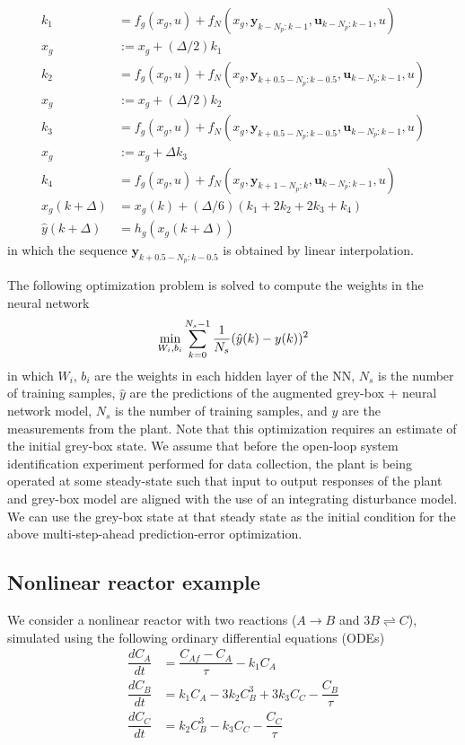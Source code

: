 \documentclass{article}
\begin{document}
\begin{align*}
  k_1 &= f_g(x_g, u) + 
  f_N(x_g, \mathbf{y}_{k-N_p:k-1}, \mathbf{u}_{k-N_p:k-1}, u) \\
  x_g & := x_g + (\Delta/2)k_1 \\
  k_2 &= f_g(x_g, u) + 
  f_N(x_g, \mathbf{y}_{k+0.5-N_p:k-0.5}, \mathbf{u}_{k-N_p:k-1}, u)\\
  x_g & := x_g + (\Delta/2)k_2 \\
  k_3 &= f_g(x_g, u) + 
  f_N(x_g, \mathbf{y}_{k+0.5-N_p:k-0.5}, \mathbf{u}_{k-N_p:k-1}, u)\\
  x_g & := x_g + \Delta k_3 \\
  k_4 &= f_g(x_g, u) + 
  f_N(x_g, \mathbf{y}_{k+1-N_p:k}, \mathbf{u}_{k-N_p:k-1}, u)\\
  x_g(k+\Delta) &= x_g(k) + (\Delta/6)(k_1 + 2k_2 + 2k_3 + k_4) \\
  \hat{y}(k+\Delta) &= h_g(x_g(k+\Delta)) 
\end{align*}
in which the sequence $\mathbf{y}_{k+0.5-N_p:k-0.5}$ is obtained by linear
interpolation.

The following optimization problem is solved to compute the weights in the
neural network
\begin{align*}
\underset{W_i, b_i}{\textnormal{min}} \sum_{k=0}^{N_s-1} 
\dfrac{1}{N_s}(\hat{y}(k) - y(k))^2
 \end{align*}
in which $W_i$, $b_i$ are the weights in each hidden layer of the NN, $N_s$ is
the number of training samples, $\hat{y}$ are the predictions of the augmented
grey-box + neural network model, $N_s$ is the number of training samples, and
$y$ are the measurements from the plant. Note that this optimization requires an
estimate of the initial grey-box state. We assume that before the open-loop
system identification experiment performed for data collection, the plant is
being operated at some steady-state such that input to output responses of the
plant and grey-box model are aligned with the use of an integrating disturbance
model. We can use the grey-box state at that steady state as the initial
condition for the above multi-step-ahead prediction-error optimization.

\subsection{Nonlinear reactor example}
We consider a nonlinear reactor with two reactions ($A \rightarrow B $ and  $3B
\rightleftharpoons C$), simulated using the following ordinary differential
equations (ODEs)
\begin{align*}
  \dfrac{dC_A}{dt} &= \dfrac{C_{Af} - C_A}{\tau} - k_1C_A\\
  \dfrac{dC_B}{dt} &= k_1C_A - 3k_2C^3_B + 3k_3C_C- \dfrac{C_B}{\tau}\\
  \dfrac{dC_C}{dt} &= k_2C^3_B - k_3C_C - \dfrac{C_C}{\tau}
\end{align*}
\end{document}
